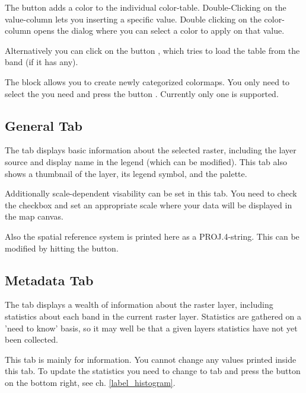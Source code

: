 The button  adds a color to the individual color-table.
Double-Clicking on the value-column lets you inserting a specific value.
Double clicking on the color-column opens the dialog  where you can select a color to apply on that value.

Alternatively you can click on the button
, which tries to
load the table from the band (if it has any).

The block  allows you to create newly
categorized colormaps. You only need to select the  you need and press the button . Currently
only one  is
supported.

\subsection{General Tab}\label{label_generaltab}

The  tab displays basic information about the selected raster,
including the layer source and  display name in the legend (which can be
modified). This tab also shows a thumbnail of the layer, its legend symbol,
and the palette.

Additionally scale-dependent visability can be set in this tab. You need to
check the checkbox and set an appropriate scale where your data will be
displayed in the map canvas.

Also the spatial reference system is printed here as a PROJ.4-string. 
This can be modified by hitting the  button.

\subsection{Metadata Tab}\label{label_metatab}

The  tab displays a wealth of information about the raster layer,
including statistics about each band in the current raster layer. Statistics
are gathered on a 'need to know' basis, so it may well be that a given layers
statistics have not yet been collected.

This tab is mainly for information. You cannot change any values printed
inside this tab. To update the statistics you need to change to tab
 and press the button  on the bottom right,
see ch. \ref{label_histogram}.

